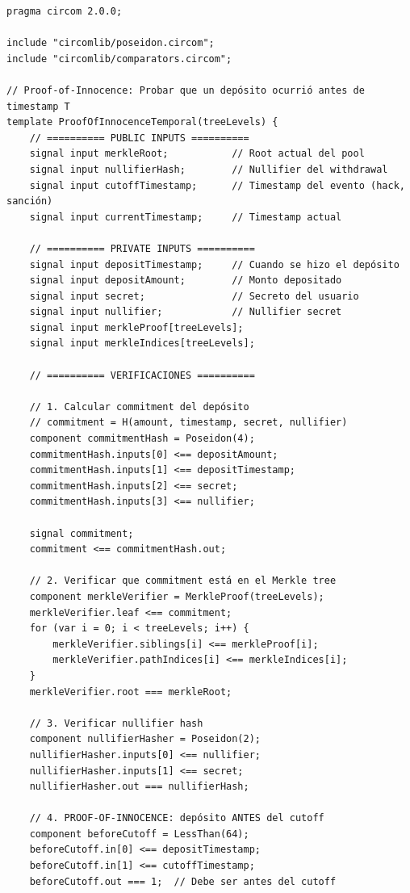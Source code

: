 \documentclass[11pt,a4paper,twoside]{book}
\theoremstyle{definition}
\theoremstyle{remark}
\begin{document}
\begin{lstlisting}[language=circom, caption={Circuito de Proof-of-Innocence temporal}]
pragma circom 2.0.0;

include "circomlib/poseidon.circom";
include "circomlib/comparators.circom";

// Proof-of-Innocence: Probar que un depósito ocurrió antes de timestamp T
template ProofOfInnocenceTemporal(treeLevels) {
    // ========== PUBLIC INPUTS ==========
    signal input merkleRoot;           // Root actual del pool
    signal input nullifierHash;        // Nullifier del withdrawal
    signal input cutoffTimestamp;      // Timestamp del evento (hack, sanción)
    signal input currentTimestamp;     // Timestamp actual
    
    // ========== PRIVATE INPUTS ==========
    signal input depositTimestamp;     // Cuando se hizo el depósito
    signal input depositAmount;        // Monto depositado
    signal input secret;               // Secreto del usuario
    signal input nullifier;            // Nullifier secret
    signal input merkleProof[treeLevels];
    signal input merkleIndices[treeLevels];
    
    // ========== VERIFICACIONES ==========
    
    // 1. Calcular commitment del depósito
    // commitment = H(amount, timestamp, secret, nullifier)
    component commitmentHash = Poseidon(4);
    commitmentHash.inputs[0] <== depositAmount;
    commitmentHash.inputs[1] <== depositTimestamp;
    commitmentHash.inputs[2] <== secret;
    commitmentHash.inputs[3] <== nullifier;
    
    signal commitment;
    commitment <== commitmentHash.out;
    
    // 2. Verificar que commitment está en el Merkle tree
    component merkleVerifier = MerkleProof(treeLevels);
    merkleVerifier.leaf <== commitment;
    for (var i = 0; i < treeLevels; i++) {
        merkleVerifier.siblings[i] <== merkleProof[i];
        merkleVerifier.pathIndices[i] <== merkleIndices[i];
    }
    merkleVerifier.root === merkleRoot;
    
    // 3. Verificar nullifier hash
    component nullifierHasher = Poseidon(2);
    nullifierHasher.inputs[0] <== nullifier;
    nullifierHasher.inputs[1] <== secret;
    nullifierHasher.out === nullifierHash;
    
    // 4. PROOF-OF-INNOCENCE: depósito ANTES del cutoff
    component beforeCutoff = LessThan(64);
    beforeCutoff.in[0] <== depositTimestamp;
    beforeCutoff.in[1] <== cutoffTimestamp;
    beforeCutoff.out === 1;  // Debe ser antes del cutoff
    

\end{lstlisting}
\end{document}
